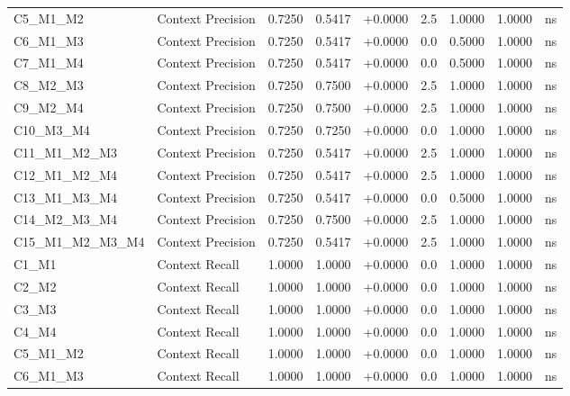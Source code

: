 \begin{table}[p]
\begin{tabular*}{\textwidth}{@{\extracolsep{\fill}} l l r r r r r r c @{}}
\addlinespace
C5\_M1\_M2      & Context Precision    & 0.7250 & 0.5417 & +0.0000 & 2.5 & 1.0000 & 1.0000 & ns \\
\addlinespace
C6\_M1\_M3      & Context Precision    & 0.7250 & 0.5417 & +0.0000 & 0.0 & 0.5000 & 1.0000 & ns \\
\addlinespace
C7\_M1\_M4      & Context Precision    & 0.7250 & 0.5417 & +0.0000 & 0.0 & 0.5000 & 1.0000 & ns \\
\addlinespace
C8\_M2\_M3      & Context Precision    & 0.7250 & 0.7500 & +0.0000 & 2.5 & 1.0000 & 1.0000 & ns \\
\addlinespace
C9\_M2\_M4      & Context Precision    & 0.7250 & 0.7500 & +0.0000 & 2.5 & 1.0000 & 1.0000 & ns \\
\addlinespace
C10\_M3\_M4     & Context Precision    & 0.7250 & 0.7250 & +0.0000 & 0.0 & 1.0000 & 1.0000 & ns \\
\addlinespace
C11\_M1\_M2\_M3 & Context Precision    & 0.7250 & 0.5417 & +0.0000 & 2.5 & 1.0000 & 1.0000 & ns \\
\addlinespace
C12\_M1\_M2\_M4 & Context Precision    & 0.7250 & 0.5417 & +0.0000 & 2.5 & 1.0000 & 1.0000 & ns \\
\addlinespace
C13\_M1\_M3\_M4 & Context Precision    & 0.7250 & 0.5417 & +0.0000 & 0.0 & 0.5000 & 1.0000 & ns \\
\addlinespace
C14\_M2\_M3\_M4 & Context Precision    & 0.7250 & 0.7500 & +0.0000 & 2.5 & 1.0000 & 1.0000 & ns \\
\addlinespace
C15\_M1\_M2\_M3\_M4 & Context Precision    & 0.7250 & 0.5417 & +0.0000 & 2.5 & 1.0000 & 1.0000 & ns \\
\addlinespace
C1\_M1          & Context Recall       & 1.0000 & 1.0000 & +0.0000 & 0.0 & 1.0000 & 1.0000 & ns \\
\addlinespace
C2\_M2          & Context Recall       & 1.0000 & 1.0000 & +0.0000 & 0.0 & 1.0000 & 1.0000 & ns \\
\addlinespace
C3\_M3          & Context Recall       & 1.0000 & 1.0000 & +0.0000 & 0.0 & 1.0000 & 1.0000 & ns \\
\addlinespace
C4\_M4          & Context Recall       & 1.0000 & 1.0000 & +0.0000 & 0.0 & 1.0000 & 1.0000 & ns \\
\addlinespace
C5\_M1\_M2      & Context Recall       & 1.0000 & 1.0000 & +0.0000 & 0.0 & 1.0000 & 1.0000 & ns \\
\addlinespace
C6\_M1\_M3      & Context Recall       & 1.0000 & 1.0000 & +0.0000 & 0.0 & 1.0000 & 1.0000 & ns \\

\end{tabular*}
\end{table}
